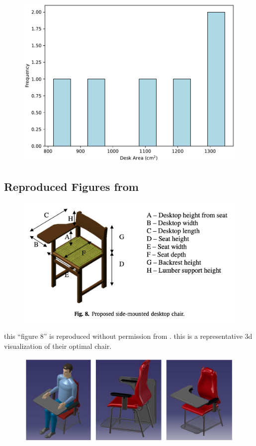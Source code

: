 \documentclass[conference]{IEEEtran}
\begin{document}
\begin{figure}[H]
    \includegraphics[width=\linewidth]{vis/hist.pdf}
\end{figure}

\pagebreak
\onecolumn

\subsection{Reproduced Figures from \cite{mohamed} \cite{Ansari}}

\begin{figure}[H]
    \centering
    \includegraphics[width=0.6\linewidth]{vis/mohamed_chair.png}
\end{figure}

this ``figure 8'' is reproduced without permission from \cite{mohamed}. this is a representative 3d visualization of their optimal chair.

\begin{figure}[H]
    \centering
    \includegraphics[width=0.6\linewidth]{vis/other_chair.png}
\end{figure}
\end{document}
